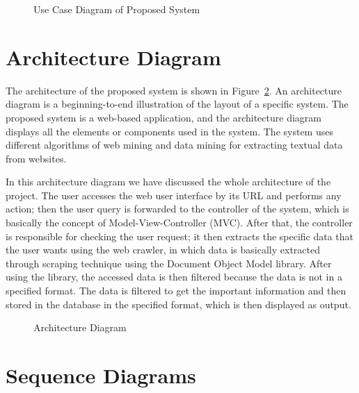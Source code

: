 \begin{figure}[H]
    \centering
    \caption{Use Case Diagram of Proposed System}
    \label{fig:usecase}
\end{figure}

\section{Architecture Diagram}

The architecture of the proposed system is shown in Figure~\ref{fig:architecture}. An architecture diagram is a beginning-to-end illustration of the layout of a specific system. The proposed system is a web-based application, and the architecture diagram displays all the elements or components used in the system. The system uses different algorithms of web mining and data mining for extracting textual data from websites.

In this architecture diagram we have discussed the whole architecture of the project. The user accesses the web user interface by its URL and performs any action; then the user query is forwarded to the controller of the system, which is basically the concept of Model-View-Controller (MVC). After that, the controller is responsible for checking the user request; it then extracts the specific data that the user wants using the web crawler, in which data is basically extracted through scraping technique using the Document Object Model library. After using the library, the accessed data is then filtered because the data is not in a specified format. The data is filtered to get the important information and then stored in the database in the specified format, which is then displayed as output.

\begin{figure}[H]
    \centering
    \caption{Architecture Diagram}
    \label{fig:architecture}
\end{figure}

\section{Sequence Diagrams}

